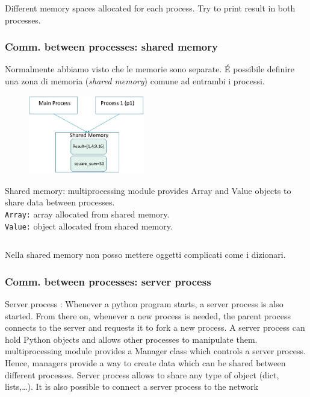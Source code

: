 Different memory spaces allocated for each process.
Try to print result in both processes.

\subsubsection{Comm. between processes: shared memory}

Normalmente abbiamo visto che le memorie sono separate. \'E possibile definire una zona di memoria (\textit{shared memory}) comune ad entrambi i processi.

\begin{figure}[ht]
    \centering
    \includegraphics[width=0.45\textwidth]{figure_parallel/shared_memory.png}\end{figure}
\FloatBarrier

Shared memory:
multiprocessing module provides Array and Value objects to share data between processes.\\
\texttt{Array:} array allocated from shared
memory.\\
\texttt{Value:} object allocated from shared
memory.

\inputminted{python}{python_parallel/communication2.py}



Nella shared memory non posso mettere oggetti complicati come i dizionari.


\subsubsection{Comm. between processes: server process}


Server process : Whenever a python program
starts, a server process is also started. From
there on, whenever a new process is needed,
the parent process connects to the server and
requests it to fork a new process.
A server process can hold Python objects and allows
other processes to manipulate them.
multiprocessing module provides a Manager class
which controls a server process. Hence, managers
provide a way to create data which can be shared
between different processes.
Server process allows to share any type of object (dict,
lists,…). It is also possible to connect a server process
to the network


